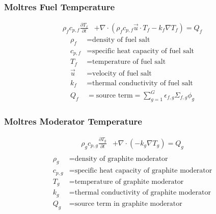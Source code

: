 \begin{frame}
        \frametitle{Moltres Fuel Temperature}
\begin{align}
        \rho_fc_{p,f}\frac{\partial T_f}{\partial t} &+ \nabla\cdot\left(\rho_f
        c_{p,f} \vec{u}\cdot T_f -k_f\nabla T_f\right) =  Q_f
\end{align}
\begin{align}
  \rho_f &= \mbox{density of fuel salt}\\
  c_{p,f} &= \mbox{specific heat capacity of fuel salt}\\
  T_f &= \mbox{temperature of fuel salt}\\
  \vec{u} &= \mbox{velocity of fuel salt}\\
  k_f &= \mbox{thermal conductivity of fuel salt}\\
  Q_f &= \mbox{source term} = \sum_{g=1}^G \epsilon_{f,g}\Sigma_{f,g}\phi_g
\end{align}
\end{frame}


\begin{frame}
        \frametitle{Moltres Moderator Temperature}
\begin{align}
        \rho_gc_{p,g}\frac{\partial T_g}{\partial t} &+
        \nabla\cdot\left(-k_g\nabla T_g\right) =  Q_g\\
\end{align}
\begin{align}
  \rho_g &= \mbox{density of graphite moderator}\\
  c_{p,g} &= \mbox{specific heat capacity of graphite moderator}\\
  T_g &= \mbox{temperature of graphite moderator}\\
  k_g &= \mbox{thermal conductivity of graphite moderator}\\
  Q_g &= \mbox{source term in graphite moderator}\\
\end{align}

\end{frame}

